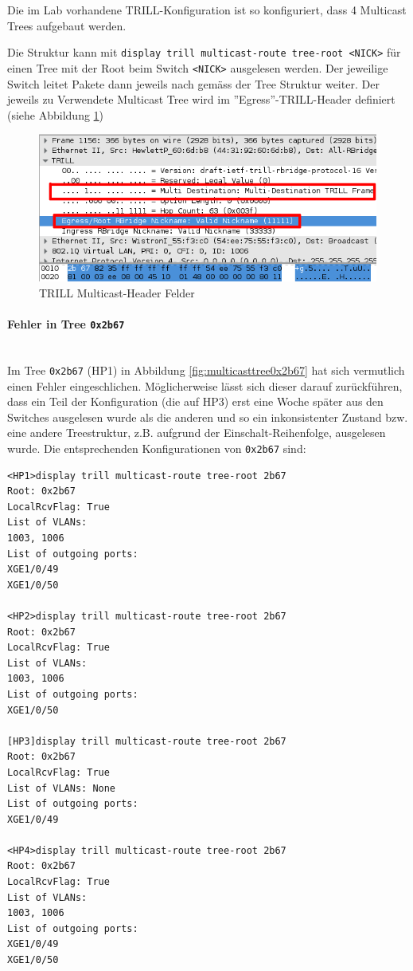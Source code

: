 Die im Lab vorhandene TRILL-Konfiguration ist so konfiguriert, dass 4 Multicast Trees aufgebaut werden.

Die Struktur kann mit \lstinline|display trill multicast-route tree-root <NICK>| für einen Tree mit der Root beim Switch \lstinline|<NICK>| ausgelesen werden. Der jeweilige Switch leitet Pakete dann jeweils nach gemäss der Tree Struktur weiter. Der jeweils zu Verwendete Multicast Tree wird im ''Egress''-TRILL-Header definiert (siehe Abbildung \ref{fig:trillheadermulticast})

\begin{figure}[H]
\centering
\includegraphics[width=0.7\linewidth]{images/trill_header_multicast}
\caption{TRILL Multicast-Header Felder}
\label{fig:trillheadermulticast}
\end{figure}


\paragraph{Fehler in Tree \lstinline|0x2b67|} \hfill \\
Im Tree \lstinline|0x2b67| (HP1) in Abbildung \ref{fig:multicasttree0x2b67} hat sich vermutlich einen Fehler eingeschlichen. Möglicherweise lässt sich dieser darauf zurückführen, dass ein Teil der Konfiguration (die auf HP3) erst eine Woche später aus den Switches ausgelesen wurde als die anderen und so ein inkonsistenter Zustand bzw. eine andere Treestruktur, z.B. aufgrund der Einschalt-Reihenfolge, ausgelesen wurde. Die entsprechenden Konfigurationen von \lstinline|0x2b67| sind:

\begin{lstlisting}
<HP1>display trill multicast-route tree-root 2b67
Root: 0x2b67
LocalRcvFlag: True
List of VLANs:
1003, 1006
List of outgoing ports:
XGE1/0/49
XGE1/0/50

<HP2>display trill multicast-route tree-root 2b67
Root: 0x2b67
LocalRcvFlag: True
List of VLANs:
1003, 1006
List of outgoing ports:
XGE1/0/50

[HP3]display trill multicast-route tree-root 2b67
Root: 0x2b67
LocalRcvFlag: True
List of VLANs: None
List of outgoing ports:
XGE1/0/49

<HP4>display trill multicast-route tree-root 2b67
Root: 0x2b67
LocalRcvFlag: True
List of VLANs:
1003, 1006
List of outgoing ports:
XGE1/0/49
XGE1/0/50
\end{lstlisting}

